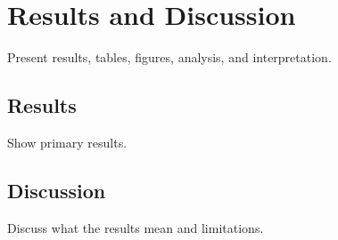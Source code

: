 \chapter{Results and Discussion}
\label{ch:results}

Present results, tables, figures, analysis, and interpretation.

\section{Results}
Show primary results.

\section{Discussion}
Discuss what the results mean and limitations.
